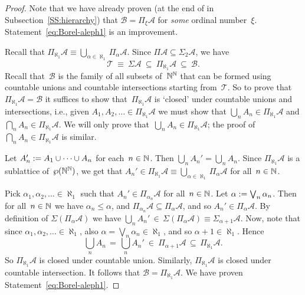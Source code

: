 \documentclass[main.tex]{subfiles}
\begin{document}
\begin{proof}
Note that we have already proven 
(at the end of
in Subsection~\ref{SS:hierarchy})
 that $\mathcal{B} = \Pi_\xi \mathcal{A}$
for \emph{some} ordinal number~$\xi$.
Statement~\eqref{eq:Borel-aleph1}
is an improvement.

Recall that $\Pi_{\aleph_1}\mathcal{A}
\equiv \bigcup_{\alpha\in\aleph_1} \Pi_\alpha \mathcal{A}$.
Since $\Pi \mathcal{A} \subseteq \Sigma_2 \mathcal{A}$,
we have
\begin{equation*}
\mathcal{T} \ \equiv\  \Sigma \mathcal{A} 
\ \subseteq\  \Pi_{\aleph_1}\mathcal{A}\ \subseteq\ \mathcal{B}.
\end{equation*}
Recall that~$\mathcal{B}$
is the family of all subsets of~$\mathbb{N}^{\mathbb{N}}$
that can be formed using countable unions and countable intersections
starting from~$\mathcal{T}$.
So to prove that $\Pi_{\aleph_1}\mathcal{A} = \mathcal{B}$
it suffices
to show that~$\Pi_{\aleph_1}\mathcal{A}$
is `closed' under countable unions and  intersections,
i.e.,
given $A_1,A_2,\dotsc \in \Pi_{\aleph_1}\mathcal{A}$
we must show that  $\bigcup_n A_n \in \Pi_{\aleph_1}\mathcal{A}$
and  $\bigcap_n A_n \in \Pi_{\aleph_1}\mathcal{A}$.
We will only prove that~$\bigcup_n A_n \in \Pi_{\aleph_1}\mathcal{A}$;
the proof of~$\bigcap_n A_n \in \Pi_{\aleph_1}\mathcal{A}$
is similar.

Let $A_n' := A_1 \cup \dotsb \cup A_n$
for each~$n\in\mathbb{N}$.
Then $\bigcup_n A_n' = \bigcup_n A_n$.
Since $\Pi_{\aleph_1}\mathcal{A}$
is a sublattice of~$\wp(\mathbb{N}^{\mathbb{N}})$,
we get that 
$A_n'\in \Pi_{\aleph_1}\mathcal{A}
\equiv\bigcup_{\alpha\in\aleph_1}\Pi_{\alpha}\mathcal{A}$
for all~$n\in\mathbb{N}$.

Pick $\alpha_1,\alpha_2,\dotsc \in \aleph_1$
such that $A_n' \in \Pi_{\alpha_n} \mathcal{A}$
for all~$n\in\mathbb{N}$.
Let $\alpha:= \bigvee_n \alpha_n$.
Then 
for all~$n\in\mathbb{N}$ we have $\alpha_n \leq \alpha$,
and  $\Pi_{\alpha_n} \mathcal{A} \subseteq \Pi_{\alpha}\mathcal{A}$,
and so $A_n'\in\Pi_{\alpha}\mathcal{A}$.
By definition of 
$ \Sigma(\Pi_{\alpha}\mathcal{A})$
we have $\bigcup_n A_n' \,\in\,
\Sigma(\Pi_{\alpha}\mathcal{A})\equiv\Sigma_{\alpha+1}\mathcal{A}$.
Now, note that since $\alpha_1,\alpha_2,\dotsc \in\aleph_1$,
also $\alpha=\bigvee_n \alpha_n \in \aleph_1$,
and so $\alpha+1 \in\aleph_1$.
Hence 
\begin{equation*}
\textstyle{\bigcup_n A_n \,=\,  \bigcup_n A_n' 
\ \in\  \Pi_{\alpha+1}\mathcal{A}
\,\subseteq\, \Pi_{\aleph_1}\mathcal{A}.}
\end{equation*}
So $\Pi_{\aleph_1} \mathcal{A}$
is closed under countable union.
Similarly, $\Pi_{\aleph_1} \mathcal{A}$
is closed under countable intersection.
It follows that  $\mathcal{B} = \Pi_{\aleph_1}\mathcal{A}$.
We have proven Statement~\eqref{eq:Borel-aleph1}.
\end{proof}
\end{document}
